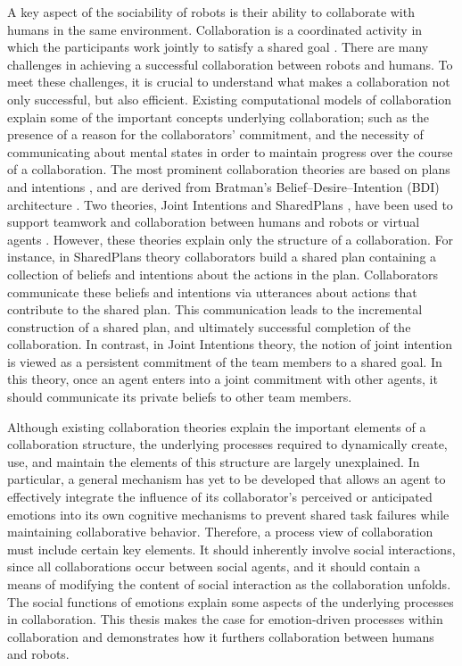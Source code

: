 \documentclass[12pt]{report}
\begin{document}
A key aspect of the sociability of robots is their ability to collaborate with
humans in the same environment. Collaboration is a coordinated activity in which
the participants work jointly to satisfy a shared goal
\cite{grosz:plans-discourse}. There are many challenges in achieving a
successful collaboration between robots and humans. To meet these challenges, it
is crucial to understand what makes a collaboration not only successful, but
also efficient. Existing computational models of collaboration explain some of
the important concepts underlying collaboration; such as the presence of a
reason for the collaborators' commitment, and the necessity of communicating
about mental states in order to maintain progress over the course of a
collaboration. The most prominent collaboration theories are based on plans and
intentions \cite{cohen:teamwork} \cite{grosz:plans-discourse}
\cite{Litman:discourse-commonsense}, and are derived from Bratman's
Belief--Desire--Intention (BDI) architecture \cite{bratman:intentions-plans}.
Two theories, Joint Intentions \cite{cohen:teamwork} and SharedPlans
\cite{grosz:planning-acting,grosz:collaboration,grosz:plans-discourse}, have
been used to support teamwork and collaboration between humans and robots or
virtual agents \cite{breazeal:humanoid-robots}
\cite{montreuil:planning-robot-activity} \cite{sidner:enagagement-robot}
\cite{yen:cast}. However, these theories explain only the structure of a
collaboration. For instance, in SharedPlans theory collaborators build a shared
plan containing a collection of beliefs and intentions about the actions in the
plan. Collaborators communicate these beliefs and intentions via utterances
about actions that contribute to the shared plan. This communication leads to
the incremental construction of a shared plan, and ultimately successful
completion of the collaboration. In contrast, in Joint Intentions theory, the
notion of joint intention is viewed as a persistent commitment of the team
members to a shared goal. In this theory, once an agent enters into a joint
commitment with other agents, it should communicate its private beliefs to other
team members.

Although existing collaboration theories explain the important elements of a
collaboration structure, the underlying processes required to dynamically
create, use, and maintain the elements of this structure are largely
unexplained. In particular, a general mechanism has yet to be developed that
allows an agent to effectively integrate the influence of its collaborator's
perceived or anticipated emotions into its own cognitive mechanisms to prevent
shared task failures while maintaining collaborative behavior. Therefore, a
process view of collaboration must include certain key elements. It should
inherently involve social interactions, since all collaborations occur between
social agents, and it should contain a means of modifying the content of social
interaction as the collaboration unfolds. The social functions of emotions
explain some aspects of the underlying processes in collaboration. This thesis
makes the case for emotion-driven processes within collaboration and
demonstrates how it furthers collaboration between humans and robots.
\end{document}
